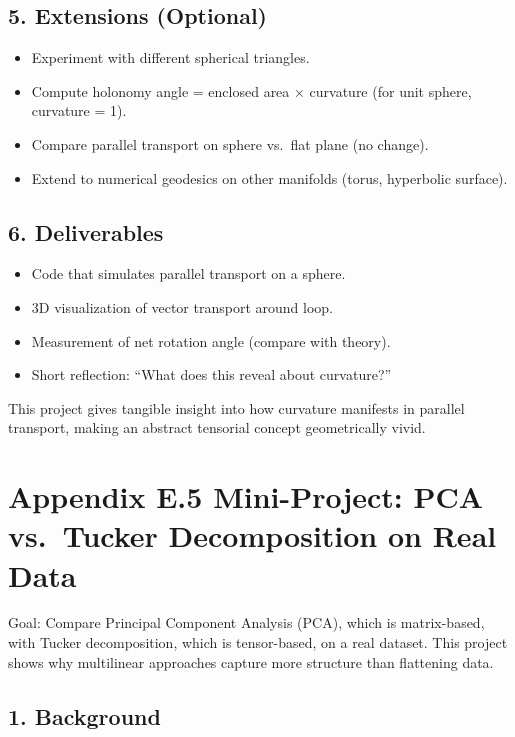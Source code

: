 \documentclass[
  letterpaper,
  DIV=11,
  numbers=noendperiod]{scrreprt}
\providecommand{\tightlist}{%
  \setlength{\itemsep}{0pt}\setlength{\parskip}{0pt}}
\begin{document}
\subsection{5. Extensions (Optional)}\label{extensions-optional-3}

\begin{itemize}
\tightlist
\item
  Experiment with different spherical triangles.
\item
  Compute holonomy angle = enclosed area × curvature (for unit sphere,
  curvature = 1).
\item
  Compare parallel transport on sphere vs.~flat plane (no change).
\item
  Extend to numerical geodesics on other manifolds (torus, hyperbolic
  surface).
\end{itemize}

\subsection{6. Deliverables}\label{deliverables-3}

\begin{itemize}
\tightlist
\item
  Code that simulates parallel transport on a sphere.
\item
  3D visualization of vector transport around loop.
\item
  Measurement of net rotation angle (compare with theory).
\item
  Short reflection: ``What does this reveal about curvature?''
\end{itemize}

This project gives tangible insight into how curvature manifests in
parallel transport, making an abstract tensorial concept geometrically
vivid.

\section{Appendix E.5 Mini-Project: PCA vs.~Tucker Decomposition on Real
Data}\label{appendix-e.5-mini-project-pca-vs.-tucker-decomposition-on-real-data}

Goal: Compare Principal Component Analysis (PCA), which is matrix-based,
with Tucker decomposition, which is tensor-based, on a real dataset.
This project shows why multilinear approaches capture more structure
than flattening data.

\subsection{1. Background}\label{background-4}
\end{document}
